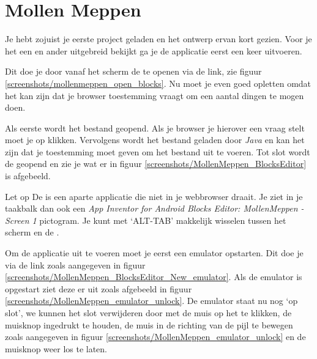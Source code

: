 \chapter{Mollen Meppen}

Je hebt zojuist je eerste project geladen en het ontwerp ervan kort gezien. Voor je het een en ander uitgebreid bekijkt ga je de applicatie eerst een keer uitvoeren.

Dit doe je door vanaf het  scherm de  te openen via de  link, zie figuur \ref{screenshots/mollenmeppen_open_blocks}. Nu moet je even goed opletten omdat het kan zijn dat je browser toestemming vraagt om een aantal dingen te mogen doen.


Als eerste wordt het  bestand geopend. Als je browser je hierover een vraag stelt moet je op  klikken. Vervolgens wordt het bestand geladen door \emph{Java} en kan het zijn dat je toestemming moet geven om het bestand uit te voeren. Tot slot wordt de  geopend en zie je wat er in figuur \ref{screenshots/MollenMeppen_BlocksEditor} is afgebeeld.


\runOpTelefoon{} 

\begin{derivation}{Let op}
De  is een aparte applicatie die niet in je webbrowser draait. Je ziet in je taakbalk dan ook een \emph{App Inventor for Android Blocks Editor: MollenMeppen - Screen 1} pictogram. Je kunt met `ALT-TAB' makkelijk wisselen tussen het  scherm en de .
\end{derivation}

Om de applicatie uit te voeren moet je eerst een emulator opstarten. Dit doe je via de  link zoals aangegeven in figuur \ref{screenshots/MollenMeppen_BlocksEditor_New_emulator}. Als de emulator is opgestart ziet deze er uit zoals afgebeeld in figuur \ref{screenshots/MollenMeppen_emulator_unlock}. De emulator staat nu nog `op slot', we kunnen het slot verwijderen door met de muis op het  te klikken, de muisknop ingedrukt te houden, de muis in de richting van de pijl te bewegen zoals aangegeven in figuur \ref{screenshots/MollenMeppen_emulator_unlock} en de muisknop weer los te laten.

